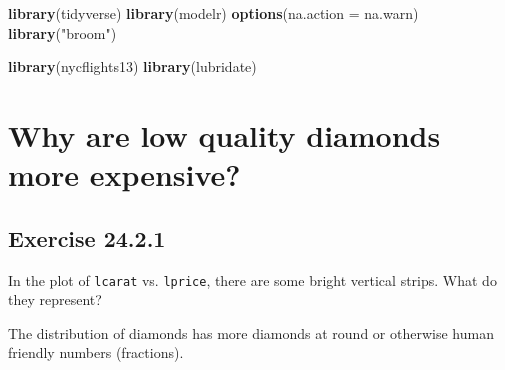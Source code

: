 \documentclass[]{book}
\newenvironment{Shaded}{\begin{snugshade}}{\end{snugshade}}
\newcommand{\DataTypeTok}[1]{\textcolor[rgb]{0.13,0.29,0.53}{#1}}
\newcommand{\FloatTok}[1]{\textcolor[rgb]{0.00,0.00,0.81}{#1}}
\newcommand{\KeywordTok}[1]{\textcolor[rgb]{0.13,0.29,0.53}{\textbf{#1}}}
\newcommand{\NormalTok}[1]{#1}
\newcommand{\OperatorTok}[1]{\textcolor[rgb]{0.81,0.36,0.00}{\textbf{#1}}}
\newcommand{\StringTok}[1]{\textcolor[rgb]{0.31,0.60,0.02}{#1}}
\theoremstyle{plain}
\theoremstyle{remark}
\begin{document}
\begin{Shaded}
\begin{Highlighting}[]
\KeywordTok{library}\NormalTok{(tidyverse)}
\KeywordTok{library}\NormalTok{(modelr)}
\KeywordTok{options}\NormalTok{(}\DataTypeTok{na.action =}\NormalTok{ na.warn)}
\KeywordTok{library}\NormalTok{(}\StringTok{"broom"}\NormalTok{)}

\KeywordTok{library}\NormalTok{(nycflights13)}
\KeywordTok{library}\NormalTok{(lubridate)}
\end{Highlighting}
\end{Shaded}

\hypertarget{why-are-low-quality-diamonds-more-expensive}{%
\section{Why are low quality diamonds more
expensive?}\label{why-are-low-quality-diamonds-more-expensive}}

\begin{Shaded}
\end{Shaded}

\hypertarget{exercise-24.2.1}{%
\subsection*{\texorpdfstring{Exercise
{24.2.1}}{Exercise 24.2.1}}\label{exercise-24.2.1}}

In the plot of \texttt{lcarat} vs. \texttt{lprice}, there are some
bright vertical strips. What do they represent?

The distribution of diamonds has more diamonds at round or otherwise
human friendly numbers (fractions).
\end{document}
